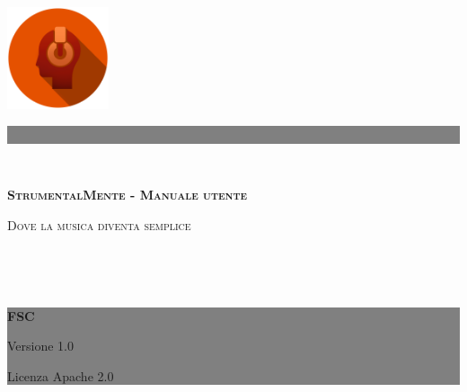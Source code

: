 \begin{titlingpage}
	\noindent\begin{minipage}{0.6\textwidth}
	\hspace*{1.5cm}\includegraphics[width=3cm]{../include/LogoStrumentalMente.png}
	\end{minipage}\begin{minipage}{0.4\textwidth}
	\colorbox{gray}{\parbox{\textwidth}{~\vspace*{5cm}}}
	\end{minipage}\\
	\colorbox{mainColor}{%
		\parbox[c][2.6cm][c]{\textwidth}{%
			\color{white}\huge\flushright \textsc{\bf StrumentalMente - Manuale utente}\hspace*{1.5cm}\par
			\Large \textsc{Dove la musica diventa semplice}\hspace*{1.5cm}
		}
	}\\
	\begin{minipage}{0.6\textwidth}
	~
	\end{minipage}\begin{minipage}{0.4\textwidth}
	\colorbox{gray}{\parbox[c][9.3cm]{\textwidth}{\color{white}\centering\vfill \textbf{FSC}\par Versione 1.0\par Licenza Apache 2.0\vspace*{2.5cm}}}
	\end{minipage}
	\restoregeometry
\end{titlingpage}
